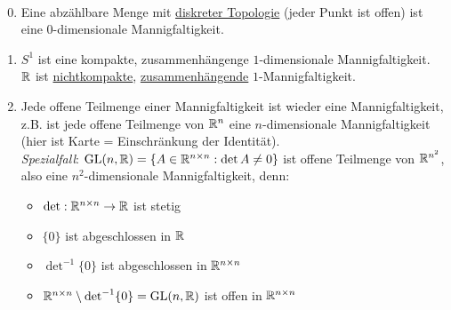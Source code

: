 \begin{example}
  \
  \begin{enumerate}
    \setcounter{enumi}{-1}

    \item Eine abzählbare Menge mit \hyperref[bsp:diskreteTopologie]{diskreter Topologie} (jeder Punkt ist offen) ist eine $ 0 $-dimensionale Mannigfaltigkeit.

    \item $ S^1 $ ist eine kompakte, zusammenhängenge $ 1 $-dimensionale Mannigfaltigkeit. \\
      $ \mathbb{R} $ ist \hyperref[def:kompakt]{nichtkompakte}, \hyperref[def:zusammenhaengend]{zusammenhängende} $ 1 $-Mannigfaltigkeit.

    \item Jede offene Teilmenge einer Mannigfaltigkeit ist wieder eine Mannigfaltigkeit, z.B. ist jede offene Teilmenge von $ \mathbb{R}^n $ eine $ n $-dimensionale Mannigfaltigkeit (hier ist Karte = Einschränkung der Identität). \\
    \emph{Spezialfall}: $ \text{GL}(n,\mathbb{R}) = \{ A \in \mathbb{R}^{n \times n} : \det A \neq 0 \} $ ist offene Teilmenge von $ \mathbb{R}^{n^2} $, also eine $ n^2 $-dimensionale Mannigfaltigkeit, denn:
    \begin{itemize}
      \item $ \det : \mathbb{R}^{n \times n} \to \mathbb{R} $ ist stetig
      \item $ \{ 0 \} $ ist abgeschlossen in $ \mathbb{R} $ 
      \item $ \det^{-1} \{ 0 \} $ ist abgeschlossen in $ \mathbb{R}^{n \times n} $
      \item $ \mathbb{R}^{n \times n} \setminus \det^{-1} \{ 0 \} = \text{GL}(n,\mathbb{R} ) $ ist offen in $ \mathbb{R}^{n \times n} $
    \end{itemize}


\end{enumerate}
\end{example}
